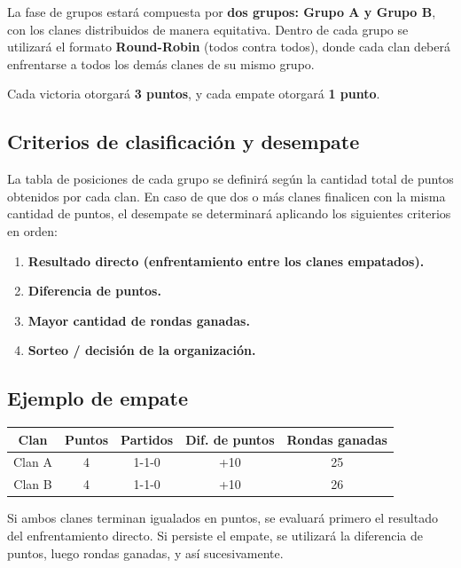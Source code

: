 \documentclass[a4paper, 11pt]{article}
\begin{document}
    La fase de grupos estará compuesta por \textbf{dos grupos: Grupo A y Grupo B}, con los clanes distribuidos de manera equitativa.  
    Dentro de cada grupo se utilizará el formato \textbf{Round-Robin} (todos contra todos), donde cada clan deberá enfrentarse a todos los demás clanes de su mismo grupo.

    Cada victoria otorgará \textbf{3 puntos}, y cada empate otorgará \textbf{1 punto}.

    \subsection{Criterios de clasificación y desempate}

    La tabla de posiciones de cada grupo se definirá según la cantidad total de puntos obtenidos por cada clan.  
    En caso de que dos o más clanes finalicen con la misma cantidad de puntos, el desempate se determinará aplicando los siguientes criterios en orden:

    \begin{enumerate}
        \item \textbf{Resultado directo (enfrentamiento entre los clanes empatados).}
        \item \textbf{Diferencia de puntos.}
        \item \textbf{Mayor cantidad de rondas ganadas.}
        \item \textbf{Sorteo / decisión de la organización.}
    \end{enumerate}

    \subsection{Ejemplo de empate}

    \begin{center}
        \begin{tabular}{||c c c c c||} 
        \hline
        Clan & Puntos & Partidos & Dif. de puntos & Rondas ganadas \\ [0.5ex] 
        \hline\hline
        Clan A & 4 & 1-1-0 & +10 & 25 \\ 
        \hline
        Clan B & 4 & 1-1-0 & +10 & 26 \\
        \hline
        \end{tabular}
    \end{center}

    Si ambos clanes terminan igualados en puntos, se evaluará primero el resultado del enfrentamiento directo.  
    Si persiste el empate, se utilizará la diferencia de puntos, luego rondas ganadas, y así sucesivamente.
\end{document}
